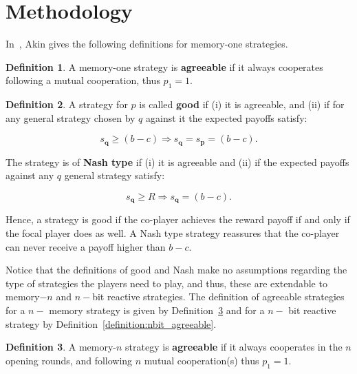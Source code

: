 \documentclass{article}
\theoremstyle{definition}
\newtheorem{definition}{Definition}[section]
\begin{document}
\section{Methodology}\label{section:methodology}

In~\citep{akin:EGADS:2016}, Akin gives the following definitions for memory-one
strategies.

\begin{definition}
A memory-one strategy is \textbf{agreeable} if it always cooperates following a mutual cooperation,
thus \(p_1=1\).
\end{definition}

\begin{definition}
  A strategy for \(p\) is called \textbf{good} if (i) it is agreeable,
  and (ii) if for any general strategy chosen by \(q\) against it the expected
  payoffs satisfy:
  
  \begin{equation}
    s_{\mathbf{q}} \geq (b - c) \Rightarrow s_{\mathbf{q}} = s_{\mathbf{p}} =  (b - c).
  \end{equation}

  The strategy is of \textbf{Nash type} if (i) it is agreeable and (ii) if the
  expected payoffs against any \(q\) general strategy satisfy:

  \begin{equation}
    s_{\mathbf{q}} \geq R \Rightarrow s_{\mathbf{q}} =  (b - c).
  \end{equation}
\end{definition}

Hence, a strategy is good if the co-player achieves the reward payoff if and
only if the focal player does as well. A Nash type strategy reassures that the
co-player can never receive a payoff higher than \(b - c\).

Notice that the definitions of good and Nash make no assumptions regarding the
type of strategies the players need to play, and thus, these are extendable to
memory\(-n\) and \(n-\)bit reactive strategies. The definition of agreeable
strategies for a \(n-\) memory strategy is given by
Definition~\ref{definition:memn_agreeable} and for a \(n-\) bit reactive
strategy by Definition~\ref{definition:nbit_agreeable}.

\begin{definition}\label{definition:memn_agreeable}
  A memory-\(n\) strategy is \textbf{agreeable} if it always cooperates in the
  \(n\) opening rounds, and following \(n\) mutual cooperation(s) thus
  \(p_1=1\).
\end{definition}
\end{document}
